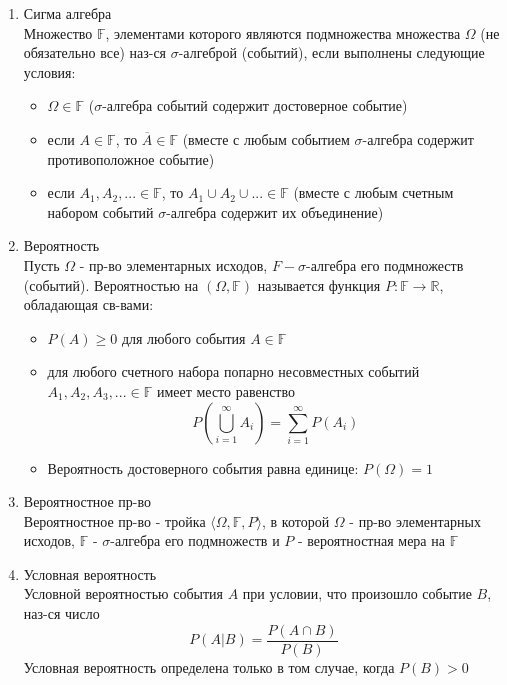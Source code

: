 \documentclass[a4paper, 12pt]{article}
\begin{document}
\begin{enumerate}
    \item Сигма алгебра\\
    Множество $\mathbb{F}$, элементами которого являются подмножества множества $\Omega$ (не обязательно все) наз-ся $\sigma$-алгеброй (событий), если выполнены следующие условия:
    \begin{itemize}
        \item $\Omega\in \mathbb{F}$ ($\sigma$-алгебра событий содержит достоверное событие)
        \item если $A\in \mathbb{F}$, то $\overline{A}\in \mathbb{F}$ (вместе с любым событием $\sigma$-алгебра содержит противоположное событие)
        \item если $A_1,A_2,... \in\mathbb{F}$, то $A_1\cup A_2\cup ... \in \mathbb{F}$ (вместе с любым счетным набором событий $\sigma$-алгебра содержит их объединение)
    \end{itemize}
    
    \item Вероятность\\
    Пусть $\Omega$ - пр-во элементарных исходов, $F-\sigma$-алгебра его подмножеств (событий). Вероятностью на $(\Omega,\mathbb{F})$ называется функция $P:\mathbb{F}\rightarrow\mathbb{R}$, обладающая св-вами:
    \begin{itemize}
        \item $P(A)\geq 0$ для любого события $A\in\mathbb{F}$
        \item для любого счетного набора попарно несовместных событий $A_1,A_2,A_3,...\in\mathbb{F}$ имеет место равенство\\
        \[ P(\bigcup_{i=1}^{\infty} A_i) = \sum\limits_{i=1}^{\infty} P(A_i) \]
        \item Вероятность достоверного события равна единице: $P(\Omega)=1$
    \end{itemize}
    
    \item Вероятностное пр-во\\
    Вероятностное пр-во - тройка $\langle \Omega,\mathbb{F},P\rangle$, в которой $\Omega$ - пр-во элементарных исходов, $\mathbb{F}$ - $\sigma$-алгебра его подмножеств и $P$ - вероятностная мера на $\mathbb{F}$
    
    \item Условная вероятность\\
    Условной вероятностью события $A$ при условии, что произошло событие $B$, наз-ся число
    \[ P(A|B)=\frac{P(A\cap B)}{P(B)}  \]
    Условная вероятность определена только в том случае, когда $P(B)> 0$
    

\end{enumerate}
\end{document}
